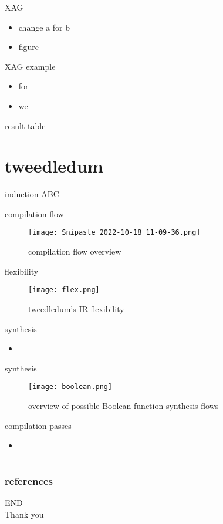 \documentclass[aspectratio=1610]{beamer}
\begin{document}
\begin{frame}{XAG}
  \begin{itemize}
    \item change a for b
    \item figure
  \end{itemize}
\end{frame}
\begin{frame}{XAG example}
  \begin{itemize}
    \item for
    \item we 
  \end{itemize}
\end{frame}
\begin{frame}{result}
  table   
\end{frame}

\section{tweedledum}
\begin{frame}{induction}  
  ABC 
\end{frame}
\begin{frame}{compilation flow}
  \begin{figure}[htbq]
    \centering
    \texttt{[image: Snipaste\_2022-10-18\_11-09-36.png]}
    \caption{compilation flow overview} 
    \label{fig-compilation}
  \end{figure}
\end{frame}
\begin{frame}{flexibility}
  \begin{figure}[htbq]
    \centering
    \texttt{[image: flex.png]}
    \caption{tweedledum's IR flexibility} 
    \label{fig-flex}
  \end{figure}
\end{frame}
\begin{frame}{synthesis}
  \begin{itemize}
    \item 
  \end{itemize}  
\end{frame}
\begin{frame}{synthesis}
  \begin{figure}[htbq]
    \centering
    \texttt{[image: boolean.png]}
    \caption{overview of possible Boolean function synthesis flows} 
    \label{fig-boolean}
  \end{figure}
\end{frame}
\begin{frame}{compilation passes}
  \begin{itemize}
    \item 
  \end{itemize}
\end{frame}
\section*{}
\begin{frame}
	\frametitle{references}
	\printbibliography
\end{frame}
\begin{frame}
\centering
\Huge{END\\Thank you}
\end{frame}
\end{document}
